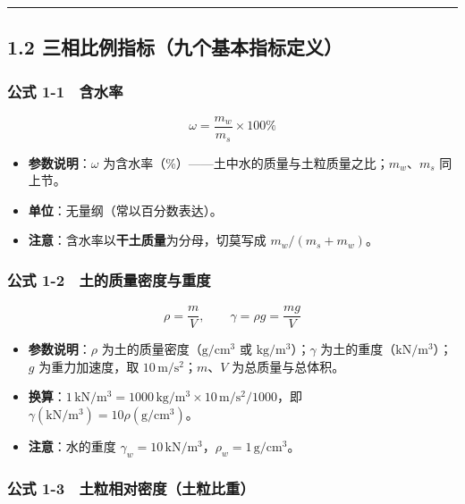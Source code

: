 \documentclass[
]{article}
\providecommand{\tightlist}{%
  \setlength{\itemsep}{0pt}\setlength{\parskip}{0pt}}
\begin{document}
\begin{center}\rule{0.5\linewidth}{0.5pt}\end{center}

\subsection{1.2
三相比例指标（九个基本指标定义）}\label{ux4e09ux76f8ux6bd4ux4f8bux6307ux6807ux4e5dux4e2aux57faux672cux6307ux6807ux5b9aux4e49}

\subsubsection{公式
1-1　含水率}\label{ux516cux5f0f-1-1-ux542bux6c34ux7387}

\[\omega=\frac{m_w}{m_s}\times100\%\]

\begin{itemize}
\tightlist
\item
  \textbf{参数说明}：\(\omega\)
  为含水率（\%）------土中水的质量与土粒质量之比；\(m_w\)、\(m_s\)
  同上节。
\item
  \textbf{单位}：无量纲（常以百分数表达）。
\item
  \textbf{注意}：含水率以\textbf{干土质量}为分母，切莫写成
  \(m_w/(m_s+m_w)\)。
\end{itemize}

\subsubsection{公式
1-2　土的质量密度与重度}\label{ux516cux5f0f-1-2-ux571fux7684ux8d28ux91cfux5bc6ux5ea6ux4e0eux91cdux5ea6}

\[\rho=\frac{m}{V},\qquad \gamma=\rho g=\frac{mg}{V}\]

\begin{itemize}
\tightlist
\item
  \textbf{参数说明}：\(\rho\) 为土的质量密度（\(\mathrm{g/cm^3}\) 或
  \(\mathrm{kg/m^3}\)）；\(\gamma\)
  为土的重度（\(\mathrm{kN/m^3}\)）；\(g\) 为重力加速度，取
  \(10\,\mathrm{m/s^2}\)；\(m\)、\(V\) 为总质量与总体积。
\item
  \textbf{换算}：\(1\,\mathrm{kN/m^3}=1000\,\mathrm{kg/m^3}\times10\,\mathrm{m/s^2}/1000\)，即
  \(\gamma(\mathrm{kN/m^3})=10\rho(\mathrm{g/cm^3})\)。
\item
  \textbf{注意}：水的重度
  \(\gamma_w=10\,\mathrm{kN/m^3}\)，\(\rho_w=1\,\mathrm{g/cm^3}\)。
\end{itemize}

\subsubsection{公式
1-3　土粒相对密度（土粒比重）}\label{ux516cux5f0f-1-3-ux571fux7c92ux76f8ux5bf9ux5bc6ux5ea6ux571fux7c92ux6bd4ux91cd}
\end{document}
